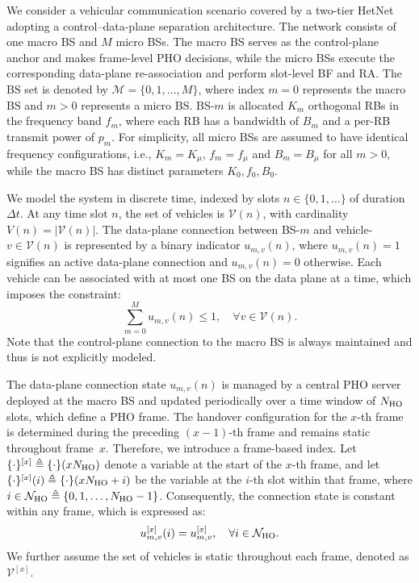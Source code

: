 \documentclass[conference, a4paper]{IEEEtran}
\theoremstyle{remark}
\begin{document}
We consider a vehicular communication scenario covered by a two-tier HetNet adopting a {control–data-plane separation} architecture. 
The network consists of one macro BS and $M$ micro BSs. The macro BS serves as the control-plane anchor and makes {frame-level} PHO decisions, while the micro BSs execute the corresponding {data-plane} re-association and perform {slot-level} BF and RA.
The BS set is denoted by $\mathcal{M} = \{0, 1, \dots, M\}$, where index $m=0$ represents the macro BS and $m>0$ represents a micro BS. BS-$m$ is allocated $K_m$ orthogonal RBs in the frequency band $f_m$, where each RB has a bandwidth of $B_m$ and a per-RB transmit power of $p_m$. 
For simplicity, all micro BSs are assumed to have identical frequency configurations, i.e., $K_m = K_\mu$, $f_m = f_\mu$ and $B_m = B_\mu$ for all $m>0$, while the macro BS has distinct parameters ${K_0, f_0, B_0}$.

We model the system in discrete time, indexed by slots $n \in \{0, 1, \dots\}$ of duration $\Delta t$. At any time slot $n$, the set of vehicles is $\mathcal{V}(n)$, with cardinality $V(n) = |\mathcal{V}(n)|$. The {data-plane}
connection between BS-$m$ and vehicle-$v \in \mathcal{V}(n)$ is represented by a binary indicator $u_{m,v}(n)$, where $u_{m,v}(n)=1$ signifies an active data-plane connection and $u_{m,v}(n)=0$ otherwise. Each vehicle can be associated with at most one BS on the data plane at a time, which imposes the constraint:
\begin{equation}
    \sum_{m=0}^{M} u_{m,v}(n) \leq 1, \quad \forall v \in \mathcal{V}(n).
    \label{eq:connection_cons}
\end{equation}
Note that the control-plane connection to the macro BS is always maintained and thus is not explicitly modeled.

The data-plane connection state $u_{m,v}(n)$ is managed by a central PHO server deployed at the macro BS and updated periodically over a time window of $N_{\rm HO}$ slots, which define a PHO frame. The handover configuration for the $x$-th frame is determined during the preceding $(x-1)$-th frame and remains static throughout frame~$x$. Therefore, we introduce a frame-based index. Let $\{\cdot\}^{[x]} \triangleq \{\cdot\}(xN_{\rm HO})$ denote a variable at the start of the $x$-th frame, and let $\{\cdot\}^{[x]}(i) \triangleq \{\cdot\}(xN_{\rm HO} + i)$ be the variable at the $i$-th slot within that frame, where $i \in \mathcal{N}_{\rm HO} \triangleq \{0,1,\dots,N_{\rm HO}-1\}$. Consequently, the connection state is constant within any frame, which is expressed as:
    \begin{equation}
        u_{m,v}^{[x]}(i) = u_{m,v}^{[x]}, \quad \forall i \in \mathcal{N}_{\rm HO}.
        \label{eq:PHO_cons}
    \end{equation}
We further assume the set of vehicles is static throughout each frame, denoted as $\mathcal{V}^{[x]}$.
\end{document}
